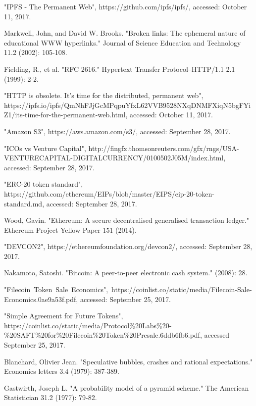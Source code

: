 \documentclass[conference]{IEEEtran}
\begin{document}
\begin{thebibliography}{1}
 "IPFS - The Permanent Web", https://github.com/ipfs/ipfs/, accessed: October 11, 2017.

 Markwell, John, and David W. Brooks. "Broken links: The ephemeral nature of educational WWW hyperlinks." Journal of Science Education and Technology 11.2 (2002): 105-108.

 Fielding, R., et al. "RFC 2616." Hypertext Transfer Protocol–HTTP/1.1 2.1 (1999): 2-2.

 "HTTP is obsolete. It's time for the distributed, permanent web", https://ipfs.io/ipfs/QmNhFJjGcMPqpuYfxL62VVB9528NXqDNMFXiqN5bgFYiZ1/its-time-for-the-permanent-web.html, accessed: October 11, 2017.

 "Amazon S3", https://aws.amazon.com/s3/, accessed: September 28, 2017.

 "ICOs vs Venture Capital", http://fingfx.thomsonreuters.com/gfx/rngs/USA-VENTURECAPITAL-DIGITALCURRENCY/0100502J05M/index.html, accessed: September 28, 2017.

 "ERC-20 token standard", https://github.com/ethereum/EIPs/blob/master/EIPS/eip-20-token-standard.md, accessed: September 28, 2017.

 Wood, Gavin. "Ethereum: A secure decentralised generalised transaction ledger." Ethereum Project Yellow Paper 151 (2014).

 "DEVCON2", https://ethereumfoundation.org/devcon2/, accessed: September 28, 2017.

 Nakamoto, Satoshi. "Bitcoin: A peer-to-peer electronic cash system." (2008): 28.

 "Filecoin Token Sale Economics", https://coinlist.co/static/media/Filecoin-Sale-Economics.0ae9a53f.pdf, accessed: September 25, 2017.

 "Simple Agreement for Future Tokens", https://coinlist.co/static/media/Protocol\%20Labs\%20-\%20SAFT\%20for\%20Filecoin\%20Token\%20Presale.6ddb6fb6.pdf, accessed September 25, 2017.

 Blanchard, Olivier Jean. "Speculative bubbles, crashes and rational expectations." Economics letters 3.4 (1979): 387-389. %

 Gastwirth, Joseph L. "A probability model of a pyramid scheme." The American Statistician 31.2 (1977): 79-82.


\end{thebibliography}
\end{document}
